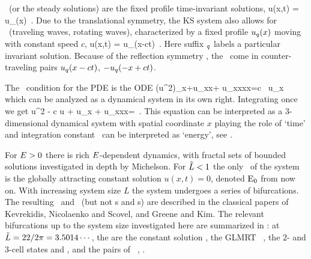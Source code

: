 \Eqva\  (or the steady solutions)
are the fixed profile time-invariant solutions,
\beq
 u(x,t) = u_\stagn(x) %
\,.
Due to the translational symmetry,
the KS system also allows for
\reqva\ (traveling waves, rotating waves),
characterized by a fixed profile $u_\stagn(x)$
moving with constant speed $c$, {\ie}
\beq
 u(x,t) =  u_\stagn(x-ct) %
\,.
Here suffix ${}_\stagn$ labels a particular invariant solution.
Because of the reflection symmetry ,
the \reqva\ come in counter-traveling pairs
$u_\stagn(x-ct)$, $-u_\stagn(-x+ct)$.

The \reqv\ condition for the {\KS} PDE 
is the ODE
\beq
{\textstyle{}}(u^2)_x+u_{xx}+ u_{xxxx}=c \, u_x
which can be analyzed as a dynamical system in its own right.
Integrating once we get
\beq
{\textstyle{}}u^2 - c u + u_x + u_{xxx}=\expctE
\,.
\label{eq:stdks}
\eeq
This equation can be interpreted as a 3-dimen\-si\-on\-al dynamical system
with spatial coordinate $x$ playing the role of `time' and integration constant \expctE\ can be interpreted as `energy',
see .

For $E>0$ there is rich
$E$-dependent dynamics, with
fractal sets of bounded solutions investigated in
depth by Michelson.
%
%
For $\tilde{L}<1$ the only \eqv\ of the system is the
globally attracting constant
solution $u(x,t)=0$, denoted $\mathrm{E}_{0}$ from now on. With increasing system size $L$ the system
undergoes a series of bifurcations.
The resulting \eqva\ and
\reqva\ (but not \po s and \rpo s)
are described in the classical papers of
Kevrekidis, Nicolaenko and Scovel,
and Greene and Kim.
The relevant bifurcations
up to the system size
investigated here are summarized
in :
at $\tilde{L}=22/2\pi =
3.5014\cdots$, the {\eqva} are the constant solution
, the GLMRT \eqv\ , the $2$-
and $3$-cell states  and ,
and the pairs of \reqva\ , .

